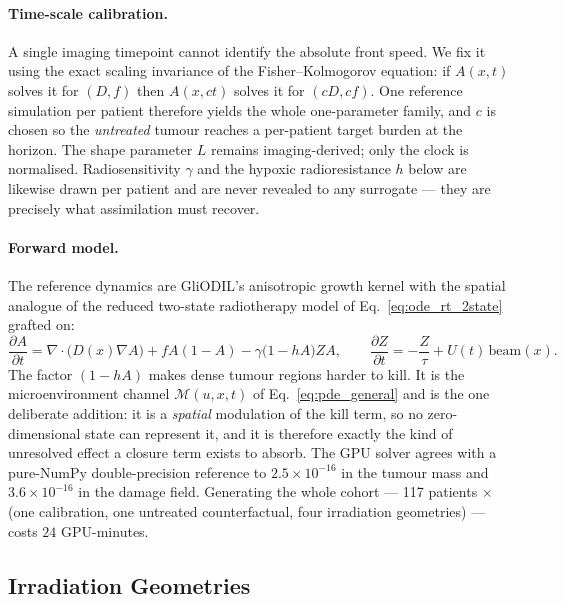 \paragraph{Time-scale calibration.}
A single imaging timepoint cannot identify the absolute front speed. We fix it
using the exact scaling invariance of the Fisher--Kolmogorov equation: if
$A(x,t)$ solves it for $(D,f)$ then $A(x,ct)$ solves it for $(cD,cf)$. One
reference simulation per patient therefore yields the whole one-parameter
family, and $c$ is chosen so the \emph{untreated} tumour reaches a per-patient
target burden at the horizon. The shape parameter $L$ remains imaging-derived;
only the clock is normalised. Radiosensitivity $\gamma$ and the hypoxic
radioresistance $h$ below are likewise drawn per patient and are never revealed
to any surrogate --- they are precisely what assimilation must recover.

\paragraph{Forward model.}
The reference dynamics are GliODIL's anisotropic growth kernel with the spatial
analogue of the reduced two-state radiotherapy model of
Eq.~\eqref{eq:ode_rt_2state} grafted on:
\begin{equation}
\label{eq:fk_rt}
\frac{\partial A}{\partial t} = \nabla\!\cdot\!\bigl(D(x)\nabla A\bigr)
 + f A(1-A) - \gamma\bigl(1 - hA\bigr) Z A,
\qquad
\frac{\partial Z}{\partial t} = -\frac{Z}{\tau} + U(t)\,\mathrm{beam}(x).
\end{equation}
The factor $(1-hA)$ makes dense tumour regions harder to kill. It is the
microenvironment channel $\mathcal{M}(u,x,t)$ of
Eq.~\eqref{eq:pde_general} and is the one deliberate addition: it is a
\emph{spatial} modulation of the kill term, so no zero-dimensional state can
represent it, and it is therefore exactly the kind of unresolved effect a
closure term exists to absorb. The GPU solver agrees with a pure-NumPy
double-precision reference to $2.5\times10^{-16}$ in the tumour mass and
$3.6\times10^{-16}$ in the damage field. Generating the whole cohort ---
117 patients $\times$ (one calibration, one untreated counterfactual,
four irradiation geometries) --- costs $24$ GPU-minutes.

\subsection{Irradiation Geometries}

